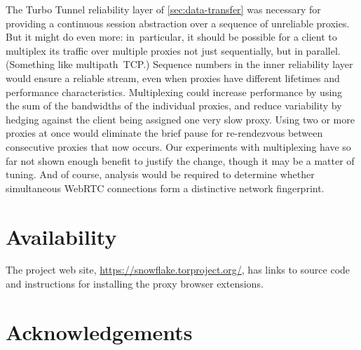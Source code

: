 \documentclass[letterpaper,twocolumn]{article}
\begin{document}
The Turbo Tunnel reliability layer of \autoref{sec:data-transfer}
was necessary for providing a continuous session abstraction
over a sequence of unreliable proxies.
But it might do even more:
in~particular, it should be possible
for a client to multiplex its traffic
over multiple proxies not just sequentially, but in parallel.
(Something like multipath~TCP.)
Sequence numbers in the inner reliability layer
would ensure a reliable stream, even when proxies
have different lifetimes and performance characteristics.
Multiplexing could increase performance by using the sum
of the bandwidths of the individual proxies,
and reduce variability by hedging against the
client being assigned one very slow proxy.
Using two or more proxies at once would
eliminate the brief pause for re-rendezvous
between consecutive proxies that now occurs.
Our experiments with multiplexing have so far
not shown enough benefit to justify the change,
though it may be a matter of tuning.
And of course, analysis would be required
to determine whether simultaneous WebRTC connections
form a distinctive network fingerprint.

\section*{Availability}

The project web site,
\url{https://snowflake.torproject.org/},
has links to source code
and instructions for installing the proxy browser extensions.

\section*{Acknowledgements}
\end{document}
